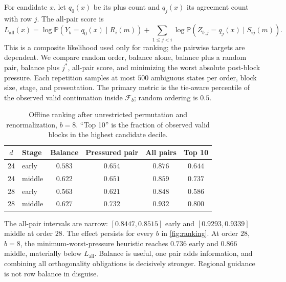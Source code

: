 \documentclass[10pt,twoside]{article}
\theoremstyle{noteplain}
\theoremstyle{definition}
\newcommand{\Prb}{\mathbb{P}}
\newcommand{\F}{\mathcal{F}}
\begin{document}
For candidate $x$, let $q_0(x)$ be its plus count and $q_j(x)$ its agreement count with row $j$.  The all-pair score is
\begin{equation}\label{eq:score}
L_{\mathrm{all}}(x)
=\log\Prb(Y_b=q_0(x)\mid R_i(m))
+\sum_{1\le j<i}\log\Prb(Z_{b,j}=q_j(x)\mid S_{ij}(m)).
\end{equation}
This is a composite likelihood used only for ranking; the pairwise targets are dependent.  We compare random order, balance alone, balance plus a random pair, balance plus $j^*$, all-pair score, and minimizing the worst absolute post-block pressure.  Each repetition samples at most $500$ ambiguous states per order, block size, stage, and presentation.  The primary metric is the tie-aware percentile of the observed valid continuation inside $\F_b$; random ordering is $0.5$.

\begin{table}[H]
\centering
\caption{Offline ranking after unrestricted permutation and renormalization, $b=8$.  ``Top 10'' is the fraction of observed valid blocks in the highest candidate decile.}
\label{tab:ranking}
\small
\begin{tabular}{@{}clcccc@{}}
\toprule
$d$ & Stage & Balance & Pressured pair & All pairs & Top 10 \\
\midrule
24 & early  & $0.583$ & $0.654$ & $0.876$ & $0.644$ \\
24 & middle & $0.622$ & $0.651$ & $0.859$ & $0.737$ \\
28 & early  & $0.563$ & $0.621$ & $0.848$ & $0.586$ \\
28 & middle & $0.627$ & $0.732$ & $0.932$ & $0.800$ \\
\bottomrule
\end{tabular}
\end{table}

The all-pair intervals are narrow: $[0.8447,0.8515]$ early and $[0.9293,0.9339]$ middle at order $28$.  The effect persists for every $b$ in \cref{fig:ranking}.  At order $28$, $b=8$, the minimum-worst-pressure heuristic reaches $0.736$ early and $0.866$ middle, materially below $L_{\mathrm{all}}$.  Balance is useful, one pair adds information, and combining all orthogonality obligations is decisively stronger.  Regional guidance is not row balance in disguise.
\end{document}

